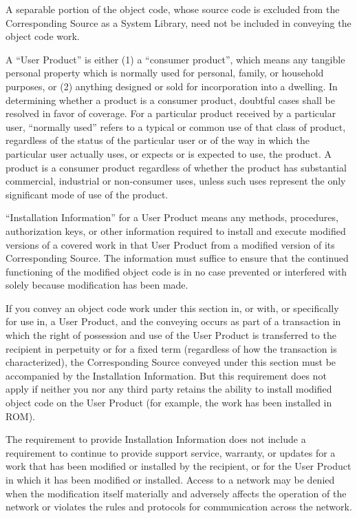 \documentclass{article}
\begin{document}
\begin{enumerate}[\hspace{-18pt}1.]
A separable portion of the object code, whose source code is excluded from the Corresponding Source as a System Library, need not be included in conveying the object code work.

A ``User Product'' is either (1) a ``consumer product'', which means any tangible personal property which is normally used for personal, family, or household purposes, or (2) anything designed or sold for incorporation into a dwelling.  In determining whether a product is a consumer product, doubtful cases shall be resolved in favor of coverage.  For a particular product received by a particular user, ``normally used'' refers to a typical or common use of that class of product, regardless of the status of the particular user or of the way in which the particular user actually uses, or expects or is expected to use, the product.  A product is a consumer product regardless of whether the product has substantial commercial, industrial or non-consumer uses, unless such uses represent the only significant mode of use of the product.

``Installation Information'' for a User Product means any methods, procedures, authorization keys, or other information required to install and execute modified versions of a covered work in that User Product from a modified version of its Corresponding Source.  The information must suffice to ensure that the continued functioning of the modified object code is in no case prevented or interfered with solely because modification has been made.

If you convey an object code work under this section in, or with, or specifically for use in, a User Product, and the conveying occurs as part of a transaction in which the right of possession and use of the User Product is transferred to the recipient in perpetuity or for a fixed term (regardless of how the transaction is characterized), the Corresponding Source conveyed under this section must be accompanied by the Installation Information.  But this requirement does not apply if neither you nor any third party retains the ability to install modified object code on the User Product (for example, the work has been installed in ROM).

The requirement to provide Installation Information does not include a requirement to continue to provide support service, warranty, or updates for a work that has been modified or installed by the recipient, or for the User Product in which it has been modified or installed.  Access to a network may be denied when the modification itself materially and adversely affects the operation of the network or violates the rules and protocols for communication across the network.


\end{enumerate}
\end{document}
